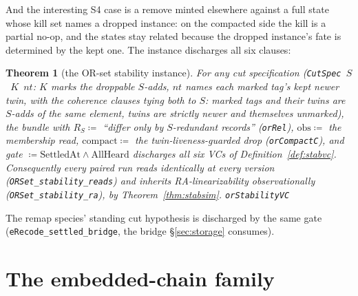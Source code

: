 \documentclass[11pt]{article}
\newtheorem{theorem}{Theorem}[section]
\let\salInlinePart\part
\renewcommand{\part}{\clearpage\salInlinePart}
\newcommand{\lean}[1]{\texttt{#1}}
\begin{document}
And the interesting
S4 case is a remove minted elsewhere against a full state whose kill
set names a dropped instance: on the compacted side the kill is a
partial no-op, and the states stay related because the dropped
instance's fate is determined by the kept one. The instance discharges
all six clauses:

\begin{theorem}[the OR-set stability instance]
\label{thm:orstab}
For any cut specification (\lean{CutSpec}~$S$~$K$~$nt$: $K$ marks the
droppable $S$-adds, $nt$ names each marked tag's kept newer twin, with
the coherence clauses tying both to $S$: marked tags and their twins
are $S$-adds of the same element, twins are strictly newer and
themselves unmarked), the bundle with $R_S \coloneqq$ ``differ only by
$S$-redundant records'' (\lean{orRel}), $\mathrm{obs} \coloneqq$ the
membership read, $\mathrm{compact} \coloneqq$ the twin-liveness-guarded
drop (\lean{orCompactC}), and gate $\coloneqq \mathrm{SettledAt} \wedge
\mathrm{AllHeard}$ discharges all six VCs of
Definition~\ref{def:stabvc}. Consequently every paired run reads
identically at every version (\lean{ORSet\_stability\_reads}) and
inherits RA-linearizability observationally
(\lean{ORSet\_stability\_ra}), by Theorem~\ref{thm:stabsim}.
\hfill\lean{orStabilityVC}
\end{theorem}

The remap species' standing cut
hypothesis is discharged by the same gate
(\lean{eRecode\_settled\_bridge}, the bridge \S\ref{sec:storage}
consumes).

\fi
\ifdefined\salPaperA\else
\part{The embedded-chain family}
\end{document}
